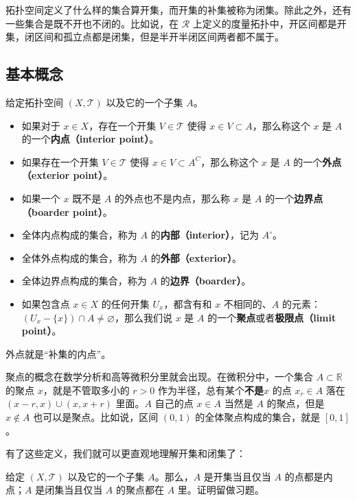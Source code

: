 
拓扑空间定义了什么样的集合算开集，而开集的补集被称为闭集。除此之外，还有一些集合是既不开也不闭的。比如说，在 $\mathcal{R}$ 上定义的度量拓扑中，开区间都是开集，闭区间和孤立点都是闭集，但是半开半闭区间两者都不属于。

\subsection{基本概念}
\begin{definition}{}\label{Topo0_def1}
给定拓扑空间 $(X, \mathcal{T})$ 以及它的一个子集 $A$。
\begin{itemize}
\item 如果对于 $x\in X$，存在一个开集 $V\in \mathcal{T}$ 使得 $x\in V\subset A$，那么称这个 $x$ 是 $A$ 的一个\textbf{内点（interior point）}。
\item 如果存在一个开集 $V\in \mathcal{T}$ 使得 $x\in V\subset A^C$，那么称这个 $x$ 是 $A$ 的一个\textbf{外点（exterior point）}。
\item 如果一个 $x$ 既不是 $A$ 的外点也不是内点，那么称 $x$ 是 $A$ 的一个\textbf{边界点（boarder point）}。

\item 全体内点构成的集合，称为 $A$ 的\textbf{内部（interior）}，记为 $A^\circ$。
\item 全体外点构成的集合，称为 $A$ 的\textbf{外部（exterior）}。
\item 全体边界点构成的集合，称为 $A$ 的\textbf{边界（boarder）}。
\item 如果包含点 $x\in X$ 的任何开集 $U_x$，都含有和 $x$ 不相同的、$A$ 的元素：$(U_x-\{x\})\cap A\not=\varnothing$，那么我们说 $x$ 是 $A$ 的一个\textbf{聚点}或者\textbf{极限点（limit point）}。
\end{itemize}
\end{definition}

外点就是“补集的内点”。

聚点的概念在数学分析和高等微积分里就会出现。在微积分中，一个集合 $A\subset\mathbb{R}$ 的聚点 $x$，就是不管取多小的 $r>0$ 作为半径，总有某个\textbf{不是}$x$ 的点 $x_r\in A$ 落在 $(x-r, x)\cup(x, x+r)$ 里面。$A$ 自己的点 $x\in A$ 当然是 $A$ 的聚点，但是 $x\not\in A$ 也可以是聚点。比如说，区间 $(0,1)$ 的全体聚点构成的集合，就是 $[0,1]$。

有了这些定义，我们就可以更直观地理解开集和闭集了：

\begin{exercise}{}\label{Topo0_exe1}
给定 $(X, \mathcal{T})$ 以及它的一个子集 $A$。那么，$A$ 是开集当且仅当 $A$ 的点都是内点；$A$ 是闭集当且仅当 $A$ 的聚点都在 $A$ 里。证明留做习题。
\end{exercise}

